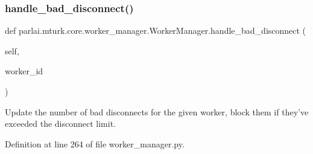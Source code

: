 \subsubsection{\texorpdfstring{handle\+\_\+bad\+\_\+disconnect()}{handle\_bad\_disconnect()}}
{\footnotesize\ttfamily def parlai.\+mturk.\+core.\+worker\+\_\+manager.\+Worker\+Manager.\+handle\+\_\+bad\+\_\+disconnect (\begin{DoxyParamCaption}\item[{}]{self,  }\item[{}]{worker\+\_\+id }\end{DoxyParamCaption})}

\begin{DoxyVerb}Update the number of bad disconnects for the given worker, block them if they've
exceeded the disconnect limit.
\end{DoxyVerb}
 

Definition at line 264 of file worker\+\_\+manager.\+py.


